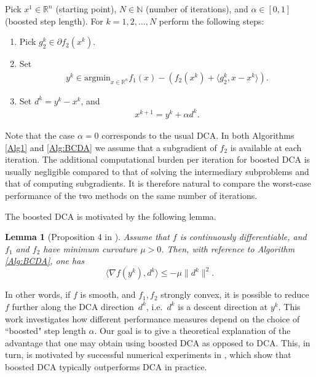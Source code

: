 \documentclass{article} %
\newtheorem{lemma}{Lemma}
\begin{document}
\begin{algorithm}[H]
\caption{Boosted DCA}
\begin{algorithmic}\label{Alg:BCDA}
\STATE Pick $x^1\in\mathbb{R}^n$ (starting point), $N \in \mathbb{N}$ (number of iterations), and $\alpha \in [0,1]$ (boosted step length).
\STATE For $k=1, 2, \ldots, N$ perform the following steps:\\
\begin{enumerate}
\item Pick  $g_2^{k}\in\partial f_2(x^{k})$.
\item
Set
\begin{align*}
  y^{k}\in \text{argmin}_{x\in\mathbb{R}^n} f_1(x)-\left(f_2(x^k)+\langle g_2^k, x-x^k\rangle\right).
\end{align*}
\item
Set $d^k = y^k - x^k$, and
\begin{align*}
  x^{k+1} = y^k + \alpha d^k.
\end{align*}
\end{enumerate}
\end{algorithmic}
\end{algorithm}
Note that the case $\alpha = 0$ corresponds to the usual DCA. In both Algorithms \ref{Alg1} and \ref{Alg:BCDA} we assume that { a subgradient of $f_2$ is} available at each iteration. The additional computational burden per iteration for boosted DCA is usually negligible compared to that of solving the intermediary subproblems and that of computing subgradients. It is therefore natural to compare the worst-case performance of the two methods on the same number of iterations.


The boosted DCA is motivated by the following lemma.
\begin{lemma}[Proposition 4 in \cite{Boosted_DCA_smooth_MP}]
Assume that $f$ is continuously differentiable, and  $f_1$ and $f_2$ have minimum curvature $\mu > 0$. Then, with reference to Algorithm \ref{Alg:BCDA}, one has
\[
\langle \nabla f(y^k), d^k\rangle \le - \mu \|d^k\|^2.
\]
\end{lemma}
In other words, if $f$ is smooth, and $f_1,f_2$ strongly convex, it is possible to reduce $f$ further along the DCA direction~$d^k$, i.e.\
$d^k$ is a descent direction at $y^k$.
This work investigates how different performance measures depend on the choice of ``boosted" step length $\alpha$.
Our goal is to give a theoretical explanation of the advantage that one may obtain using boosted DCA as opposed to DCA.
This, in turn, is motivated by successful numerical experiments in \cite{Boosted_DCA_smooth_MP,Zhang_et_al_2024_JOTA},
which show that boosted DCA typically outperforms DCA in practice.
\end{document}

